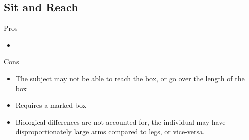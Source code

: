 \documentclass[12pt]{article}
\begin{document}
\subsection*{Sit and Reach}

\begin{minipage}[t]{0.5\textwidth}
    \begin{center}Pros\end{center}
    \begin{itemize}
        \item
    \end{itemize}
\end{minipage}
\begin{minipage}[t]{0.5\textwidth}
\begin{center}Cons\end{center}
\begin{itemize}
\item The subject may not be able to reach the box, or go over the length of the box
\item Requires a marked box
\item Biological differences are not accounted for, the individual may have disproportionately large arms compared to legs, or vice-versa.
    \end{itemize}
\end{minipage}
\end{document}
